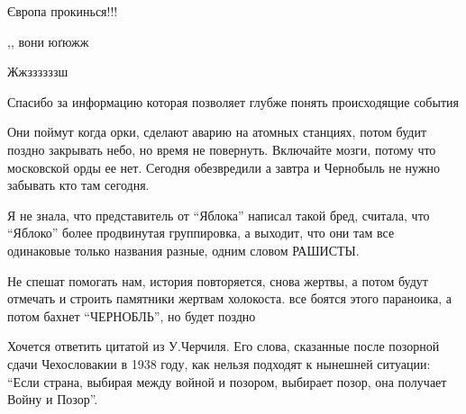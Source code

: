 \begin{itemize}
Європа прокинься!!!

,, вони юґюжж

Жжззззззш

Спасибо за информацию которая позволяет глубже понять происходящие события


Они поймут когда орки, сделают аварию на атомных станциях, потом будит поздно
закрывать небо, но время не повернуть. Включайте мозги, потому что московской
орды ее нет. Сегодня обезвредили а завтра и Чернобыль не нужно забывать кто там
сегодня.


Я не знала, что представитель от \enquote{Яблока} написал такой бред, считала, что
\enquote{Яблоко} более продвинутая группировка, а выходит, что они там все одинаковые
только названия разные, одним словом РАШИСТЫ.


Не спешат помогать нам, история повторяется, снова жертвы, а потом будут отмечать
и строить памятники жертвам холокоста. все боятся этого параноика, а потом бахнет
\enquote{ЧЕРНОБЛЬ}, но будет поздно


Хочется ответить цитатой из У.Черчиля. Его слова, сказанные после позорной
сдачи Чехословакии в 1938 году, как нельзя подходят к нынешней ситуации: \enquote{Если
страна, выбирая между войной и позором, выбирает позор, она получает Войну и
Позор}.

\end{itemize} %
